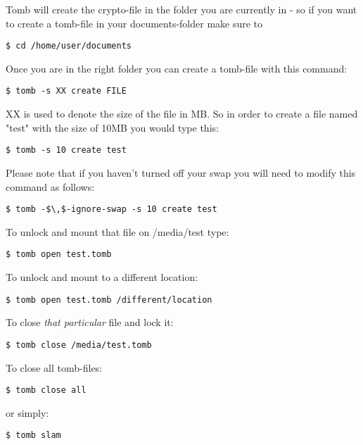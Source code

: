 \documentclass{article}
\begin{document}
 Tomb will create the crypto-file in the folder you are currently in - so if you want to create a tomb-file in your documents-folder make sure to
\begin{lstlisting}
$ cd /home/user/documents
\end{lstlisting}



 Once you are in the right folder you can create a tomb-file with this command:
\begin{lstlisting}
$ tomb -s XX create FILE
\end{lstlisting}



 XX is used to denote the size of the file in MB. So in order to create a file named "test" with the size of 10MB you would type this:
\begin{lstlisting}
$ tomb -s 10 create test
\end{lstlisting}



 Please note that if you haven't turned off your swap you will need to modify this command as follows:
\begin{lstlisting}
$ tomb -$\,$-ignore-swap -s 10 create test
\end{lstlisting}



 To unlock and mount that file on /media/test type:
\begin{lstlisting}
$ tomb open test.tomb 
\end{lstlisting}



 To unlock and mount to a different location:
\begin{lstlisting}
$ tomb open test.tomb /different/location
\end{lstlisting}



 To close \emph{that particular} file and lock it:
\begin{lstlisting}
$ tomb close /media/test.tomb
\end{lstlisting}



 To close all tomb-files:
\begin{lstlisting}
$ tomb close all
\end{lstlisting}



 or simply:
\begin{lstlisting}
$ tomb slam
\end{lstlisting}
\end{document}
